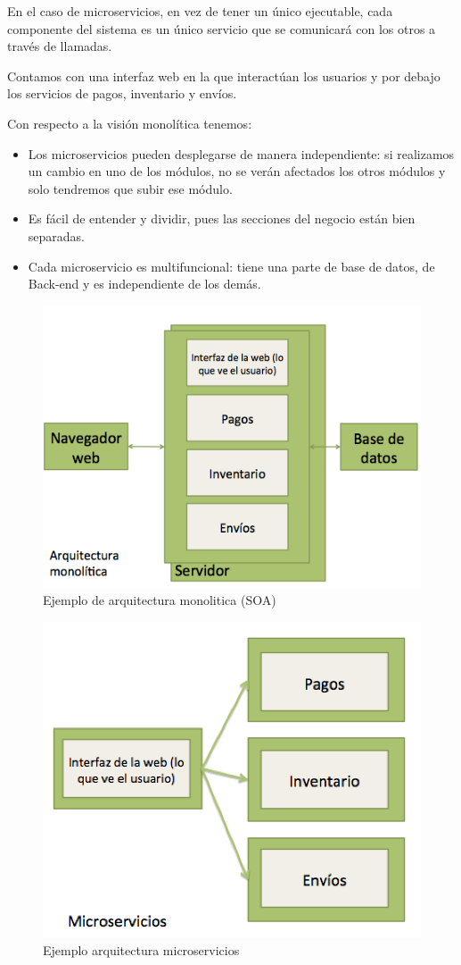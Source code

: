 \documentclass[12pt]{report} %
\begin{document}
En el caso de microservicios, en vez de tener un único ejecutable, cada componente del sistema es un único servicio que se comunicará con los otros a través de llamadas.

Contamos con una interfaz web en la que interactúan los usuarios y por debajo los servicios de pagos, inventario y envíos.

Con respecto a la visión monolítica tenemos:

\begin{itemize}
	\item Los microservicios pueden desplegarse de manera independiente: si realizamos un cambio en uno de los módulos, no se verán afectados los otros módulos y solo tendremos que subir ese módulo.
	\item Es fácil de entender y dividir, pues las secciones del negocio están bien separadas.
	\item Cada microservicio es multifuncional: tiene una parte de base de datos, de Back-end y es independiente de los demás.
\end{itemize}

\begin{figure}
	\centering
	\includegraphics[width=0.7\linewidth]{imagenes/monolithic}
	\caption{Ejemplo de arquitectura monolitica (SOA)}
	\label{fig:monolithic}
\end{figure}
\begin{figure}
	\centering
	\includegraphics[width=0.7\linewidth]{imagenes/microservices}
	\caption{Ejemplo arquitectura microservicios}
	\label{fig:microservicesGrafic}
\end{figure}
\end{document}
